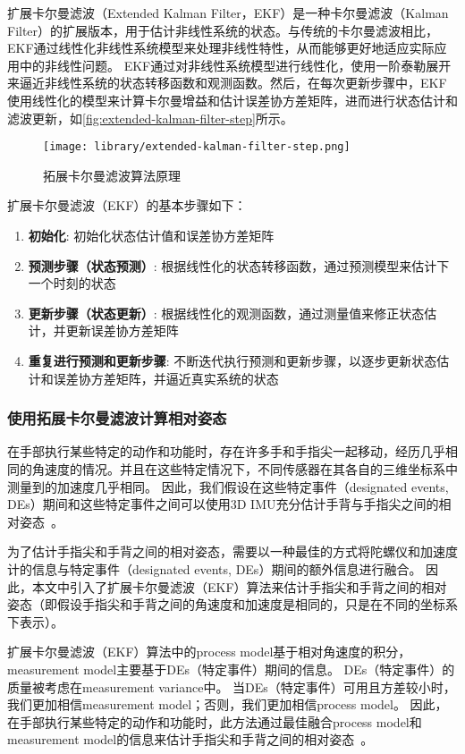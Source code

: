 扩展卡尔曼滤波（Extended Kalman Filter，EKF）是一种卡尔曼滤波（Kalman Filter）的扩展版本，用于估计非线性系统的状态。与传统的卡尔曼滤波相比，EKF通过线性化非线性系统模型来处理非线性特性，从而能够更好地适应实际应用中的非线性问题。
EKF通过对非线性系统模型进行线性化，使用一阶泰勒展开来逼近非线性系统的状态转移函数和观测函数。然后，在每次更新步骤中，EKF使用线性化的模型来计算卡尔曼增益和估计误差协方差矩阵，进而进行状态估计和滤波更新，如\autoref{fig:extended-kalman-filter-step}所示。

\begin{figure}[H]
    \centering
    \texttt{[image: library/extended-kalman-filter-step.png]}
    \caption{\label{fig:extended-kalman-filter-step}拓展卡尔曼滤波算法原理}
\end{figure}

扩展卡尔曼滤波（EKF）的基本步骤如下：
\begin{enumerate}[label=(\alph*)]
    \item {\bfseries 初始化}: 初始化状态估计值和误差协方差矩阵
    \item {\bfseries 预测步骤（状态预测）}: 根据线性化的状态转移函数，通过预测模型来估计下一个时刻的状态
    \item {\bfseries 更新步骤（状态更新）}: 根据线性化的观测函数，通过测量值来修正状态估计，并更新误差协方差矩阵
    \item {\bfseries 重复进行预测和更新步骤}: 不断迭代执行预测和更新步骤，以逐步更新状态估计和误差协方差矩阵，并逼近真实系统的状态
\end{enumerate}

\subsubsection{使用拓展卡尔曼滤波计算相对姿态}
在手部执行某些特定的动作和功能时，存在许多手和手指尖一起移动，经历几乎相同的角速度的情况。并且在这些特定情况下，不同传感器在其各自的三维坐标系中测量到的加速度几乎相同。
因此，我们假设在这些特定事件（designated events, DEs）期间和这些特定事件之间可以使用3D IMU充分估计手背与手指尖之间的相对姿态~\cite{mainArticle1}。

为了估计手指尖和手背之间的相对姿态，需要以一种最佳的方式将陀螺仪和加速度计的信息与特定事件（designated events, DEs）期间的额外信息进行融合。
因此，本文中引入了扩展卡尔曼滤波（EKF）算法来估计手指尖和手背之间的相对姿态（即假设手指尖和手背之间的角速度和加速度是相同的，只是在不同的坐标系下表示）。

扩展卡尔曼滤波（EKF）算法中的process model基于相对角速度的积分，measurement model主要基于DEs（特定事件）期间的信息。
DEs（特定事件）的质量被考虑在measurement variance中。
当DEs（特定事件）可用且方差较小时，我们更加相信measurement model；否则，我们更加相信process model。
因此，在手部执行某些特定的动作和功能时，此方法通过最佳融合process model和measurement model的信息来估计手指尖和手背之间的相对姿态~\cite{mainArticle1}。

